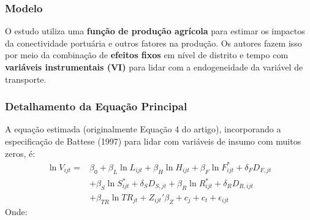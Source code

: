 \documentclass[12pt]{article}
\begin{document}
\subsubsection*{Modelo}
O estudo utiliza uma \textbf{função de produção agrícola} para estimar os impactos da conectividade portuária e outros fatores na produção. Os autores fazem isso por meio da combinação de \textbf{efeitos fixos} em nível de distrito e tempo com \textbf{variáveis instrumentais (VI)} para lidar com a endogeneidade da variável de transporte.

\subsubsection*{Detalhamento da Equação Principal}
A equação estimada (originalmente Equação 4 do artigo), incorporando a especificação de Battese (1997) para lidar com variáveis de insumo com muitos zeros, é:
\begin{equation}\label{eq:ethiopia_prod_func}
\begin{split}
\ln V_{ijt} = & \beta_{0} + \beta_{L}\ln L_{ijt} + \beta_{H}\ln H_{ijt} + \beta_{F}\ln F_{ijt}^{*} + \delta_{F}D_{F,jt} \\
& + \beta_{S}\ln S_{ijt}^{*} + \delta_{S}D_{S,jt} + \beta_{R}\ln R_{ijt}^{*} + \delta_{R}D_{R,ijt} \\
& + \beta_{TR}\ln TR_{jt} + Z_{ijt}'\beta_{Z} + c_{j} + c_{t} + \epsilon_{ijt}
\end{split}
\end{equation}
Onde:
\end{document}
